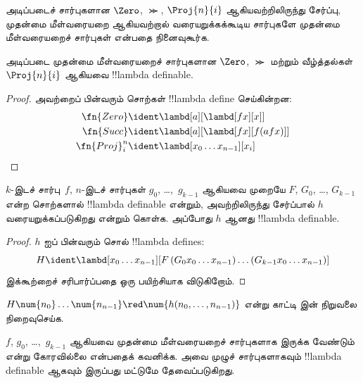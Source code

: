 \documentclass[../../../include/open-logic-section]{subfiles}
\begin{document}

அடிப்படைச் சார்புகளான $\Zero$, $\Succ$, $\Proj{n}{i}$ ஆகியவற்றிலிருந்து
சேர்ப்பு, முதன்மை மீள்வரையறை ஆகியவற்றால் வரையறுக்கக்கூடிய சார்புகளே முதன்மை
மீள்வரையறைச் சார்புகள் என்பதை நினைவுகூர்க.

\begin{lem}
  அடிப்படை முதன்மை மீள்வரையறைச் சார்புகளான $\Zero$, $\Succ$ மற்றும்
  வீழ்த்தல்கள்~$\Proj{n}{i}$ ஆகியவை !!{lambda definable}.
\end{lem}

\begin{proof}
அவற்றைப் பின்வரும் சொற்கள் !!{lambda define} செய்கின்றன:
\begin{align*}
  \fn{Zero} & \ident \lambd[a][\lambd[fx][x]]\\
  \fn{Succ} & \ident \lambd[a][\lambd[fx][f (a f x)]] \\
  \fn{Proj}^n_i & \ident \lambd[x_0\dots x_{n-1}][x_i]
\end{align*}
\end{proof}

\begin{lem}
   $k$-இடச் சார்பு~$f$, $n$-இடச் சார்புகள்
  $g_0$, \dots,~$g_{k-1}$ ஆகியவை முறையே $F$, $G_0$, \dots, $G_{k-1}$
  என்ற சொற்களால் !!{lambda definable} என்றும், அவற்றிலிருந்து சேர்ப்பால்
  $h$ வரையறுக்கப்படுகிறது என்றும் கொள்க. அப்போது $h$ ஆனது
  !!{lambda definable}.
\end{lem}

\begin{proof}
  $h$ ஐப் பின்வரும் சொல் !!{lambda define}s:
  \[
  H \ident \lambd[x_0 \dots x_{n-1}][F\, (G_0 x_0 \dots
    x_{n-1}) \dots (G_{k-1} x_0 \dots x_{n-1})]
  \]
  இக்கூற்றைச் சரிபார்ப்பதை ஒரு பயிற்சியாக விடுகிறோம்.
\end{proof}

\begin{prob}
  $H\num{n_0}\dots\num{n_{n-1}} \red \num{h(n_0, \dots,
    n_{n-1})}$ என்று காட்டி  இன் நிறுவலை
  நிறைவுசெய்க.
\end{prob}

$f$, $g_0$, \dots,~$g_{k-1}$ ஆகியவை முதன்மை மீள்வரையறைச் சார்புகளாக
இருக்க வேண்டும் என்று  கோரவில்லை என்பதைக் கவனிக்க. அவை
முழுச் சார்புகளாகவும் !!{lambda definable} ஆகவும் இருப்பது மட்டுமே
தேவைப்படுகிறது.
\end{document}
